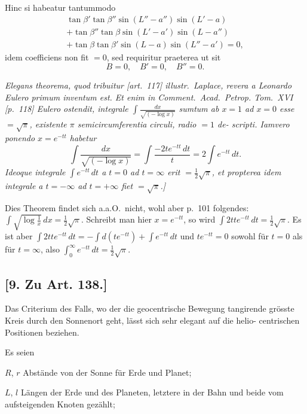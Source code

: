\documentclass[12pt,a4paper]{article}
\begin{document}
Hinc si habeatur tantummodo
\begin{multline*}
\tan\beta' \tan\beta'' \sin(L'' - a'') \sin(L' - a) \\
+ \tan\beta'' \tan\beta \sin(L' - a') \sin(L - a'') \\
+ \tan\beta \tan\beta' \sin(L - a) \sin(L'' - a') = 0,
\end{multline*}
idem coefficiens non fit $= 0$, sed requiritur praeterea ut sit
\[
B = 0, \quad B' = 0, \quad B'' = 0.
\]

\textit{Elegans theorema, quod tribuitur [art.~117] illustr.~Laplace, revera a
Leonardo Eulero primum inventum est. Et enim in Comment.~Acad.~Petrop.
Tom.~XVI [p.~118] Eulero ostendit, integrale $\int \frac{dx}{\sqrt{(-\log x)}}$ sumtum ab $x = 1$
ad $x = 0$ esse $= \sqrt{\pi}$, existente $\pi$ semicircumferentia circuli, radio $= 1$ de-
scripti. Iamvero ponendo $x = e^{-tt}$ habetur
\[
\int \frac{dx}{\sqrt{(-\log x)}} = \int \frac{-2te^{-tt}\,dt}{t} = 2\int e^{-tt}\,dt.
\]
Ideoque integrale $\int e^{-tt}\,dt$ a $t = 0$ ad $t = \infty$ erit $= \tfrac{1}{2}\sqrt{\pi}$, et propterea
idem integrale a $t = -\infty$ ad $t = +\infty$ fiet $= \sqrt{\pi}$.]}

\begin{flushright}
 Dies Theorem findet sich a.a.O.~nicht, wohl aber
p.~101 folgendes: $\int \sqrt{\log\frac{1}{x}}\,dx = \tfrac{1}{2}\sqrt{\pi}$. Schreibt man hier $x = e^{-tt}$, so wird
$\int 2tte^{-tt}\,dt = \tfrac{1}{2}\sqrt{\pi}$. Es ist aber $\int 2tte^{-tt}\,dt = -\int d(te^{-tt}) + \int e^{-tt}\,dt$ und
$te^{-tt} = 0$ sowohl f\"ur $t = 0$ als f\"ur $t = \infty$, also $\int_0^\infty e^{-tt}\,dt = \tfrac{1}{2}\sqrt{\pi}$.
\end{flushright}

\newpage

\subsection*{[9. Zu Art. 138.]}

Das Criterium des Falls, wo der die geocentrische Bewegung tangirende
gr\"osste Kreis durch den Sonnenort geht, l\"asst sich sehr elegant auf die helio-
centrischen Positionen beziehen.

Es seien

$R$, $r$ Abst\"ande von der Sonne f\"ur Erde und Planet;

$L$, $l$ L\"angen der Erde und des Planeten, letztere in der Bahn und
beide vom aufsteigenden Knoten gez\"ahlt;
\end{document}
